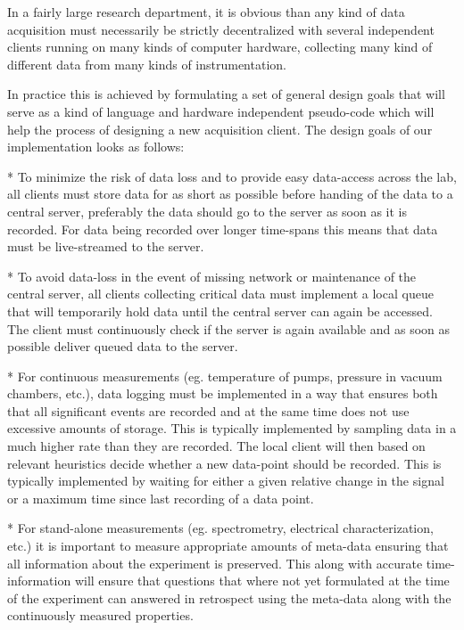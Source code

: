 In a fairly large research department, it is obvious than any kind of data
acquisition must necessarily be strictly decentralized with several independent
clients running on many kinds of computer hardware, collecting many kind of
different data from many kinds of instrumentation.

In practice this is achieved by formulating a set of general design goals that
will serve as a kind of language and hardware independent pseudo-code which
will help the process of designing a new acquisition client. The design goals
of our implementation looks as follows:

* To minimize the risk of data loss and to provide easy data-access across the
  lab, all clients must store data for as short as possible before handing of
  the data to a central server, preferably the data should go to the server as
  soon as it is recorded. For data being recorded over longer time-spans this
  means that data must be live-streamed to the server.

* To avoid data-loss in the event of missing network or maintenance of the
  central server, all clients collecting critical data must implement a local
  queue that will temporarily hold data until the central server can again be
  accessed. The client must continuously check if the server is again available
  and as soon as possible deliver queued data to the server.

* For continuous measurements (eg. temperature of pumps, pressure in vacuum
  chambers, etc.), data logging must be implemented in a way that ensures both
  that all significant events are recorded and at the same time does not use
  excessive amounts of storage. This is typically implemented by sampling data
  in a much higher rate than they are recorded. The local client will then
  based on relevant heuristics decide whether a new data-point should be
  recorded. This is typically implemented by waiting for either a given
  relative change in the signal or a maximum time since last recording of a
  data point.
  
* For stand-alone measurements (eg. spectrometry, electrical characterization,
  etc.) it is important to measure appropriate amounts of meta-data ensuring
  that all information about the experiment is preserved. This along with
  accurate time-information will ensure that questions that where not yet
  formulated at the time of the experiment can answered in retrospect using the
  meta-data along with the continuously measured properties.
  
